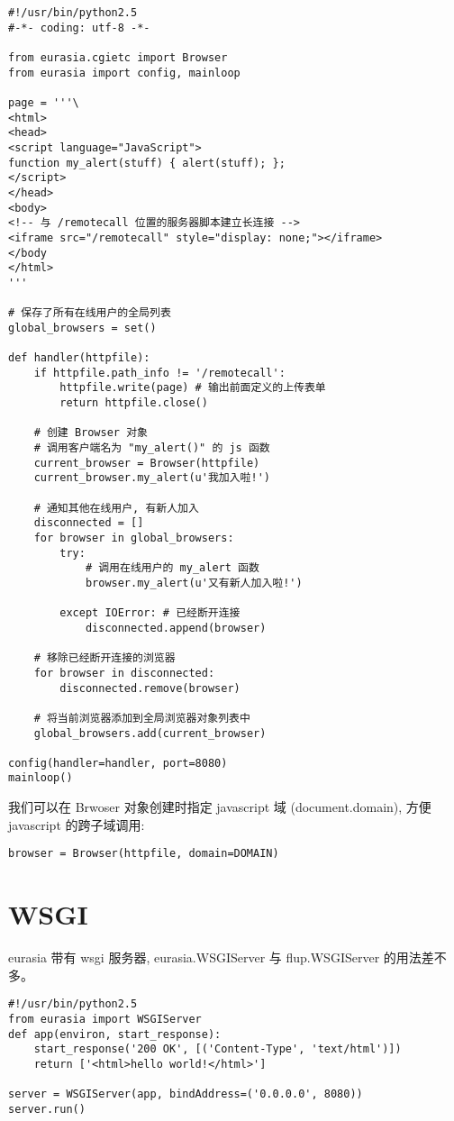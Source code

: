 \documentclass{manual}
\begin{document}
\begin{verbatim}
#!/usr/bin/python2.5
#-*- coding: utf-8 -*-

from eurasia.cgietc import Browser
from eurasia import config, mainloop

page = '''\
<html>
<head>
<script language="JavaScript">
function my_alert(stuff) { alert(stuff); };
</script>
</head>
<body>
<!-- 与 /remotecall 位置的服务器脚本建立长连接 -->
<iframe src="/remotecall" style="display: none;"></iframe>
</body
</html>
'''

# 保存了所有在线用户的全局列表
global_browsers = set()

def handler(httpfile):
	if httpfile.path_info != '/remotecall':
		httpfile.write(page) # 输出前面定义的上传表单
		return httpfile.close()

	# 创建 Browser 对象
	# 调用客户端名为 "my_alert()" 的 js 函数
	current_browser = Browser(httpfile)
	current_browser.my_alert(u'我加入啦!')

	# 通知其他在线用户, 有新人加入
	disconnected = []
	for browser in global_browsers:
		try:
			# 调用在线用户的 my_alert 函数
			browser.my_alert(u'又有新人加入啦!')

		except IOError: # 已经断开连接
			disconnected.append(browser)

	# 移除已经断开连接的浏览器
	for browser in disconnected:
		disconnected.remove(browser)

	# 将当前浏览器添加到全局浏览器对象列表中
	global_browsers.add(current_browser)

config(handler=handler, port=8080)
mainloop()
\end{verbatim}

我们可以在 Brwoser 对象创建时指定 javascript 域 (document.domain),
方便 javascript 的跨子域调用:

\begin{verbatim}
browser = Browser(httpfile, domain=DOMAIN)
\end{verbatim}


\section{WSGI}

eurasia 带有 wsgi 服务器, eurasia.WSGIServer 与 flup.WSGIServer 的用法差不多。

\begin{verbatim}
#!/usr/bin/python2.5
from eurasia import WSGIServer
def app(environ, start_response):
	start_response('200 OK', [('Content-Type', 'text/html')])
	return ['<html>hello world!</html>']

server = WSGIServer(app, bindAddress=('0.0.0.0', 8080))
server.run()
\end{verbatim}
\end{document}

